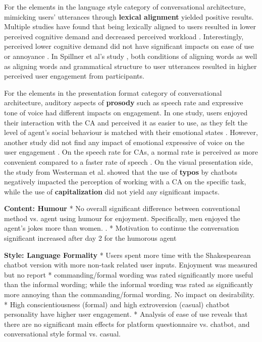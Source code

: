 \documentclass[sigconf,screen,review, anonymous]{acmart}
\newcommand{\cmt}[1]{}%
\begin{document}
For the elements in the language style category of conversational architecture, mimicking users' utterances through \textbf{lexical alignment} yielded positive results. Multiple studies have found that being lexically aligned to users resulted in lower perceived cognitive demand and decreased perceived workload \cite{huiyang2022improving}\cmt{[17]}\cite{linnemann2018can}\cmt{[15]}\cite{spillner2021talk}\cmt{[18]}. Interestingly, perceived lower cognitive demand did not have significant impacts on ease of use \cite{linnemann2018can}\cmt{[15]} or annoyance \cite{huiyang2022improving}\cmt{[17]}. In Spillner et al's study \cite{spillner2021talk}\cmt{[18]}, both conditions of aligning words as well as aligning words and grammatical structure to user utterances resulted in higher perceived user engagement from participants. 

For the elements in the presentation format category of conversational architecture, auditory aspects of \textbf{prosody} such as speech rate and expressive tone of voice had different impacts on engagement. In one study, users enjoyed their interaction with the CA and perceived it as easier to use, as they felt the level of agent's social behaviour is matched with their emotional states \cite{kim2020can}\cmt{[24]}. However, another study did not find any impact of emotional expressive of voice on the user engagement \cite{zhu2022effects}\cmt{[26]}. On the speech rate for CAs, a normal rate is perceived as more convenient compared to a faster rate of speech \cite{choi2020nobody}\cmt{[54]}. On the visual presentation side, the study from Westerman et al. \cite{westerman2019believe}\cmt{[9]} showed that the use of \textbf{typos} by chatbots negatively impacted the perception of working with a CA on the specific task, while the use of \textbf{capitalization} did not yield any significant impacts.

\textbf{Content: Humour}
* No overall significant difference between conventional method vs. agent using humour for enjoyment. Specifically, men enjoyed the agent's jokes more than women.  \cite{miyamoto2017improving}\cmt{[46]}.
* Motivation to continue the conversation significant increased after day 2 for the humorous agent \cite{go2021conversational}\cmt{[80]}

\textbf{Style: Language Formality}
* Users spent more time with the Shakespearean chatbot version with more non-task related user inputs. Enjoyment was measured but no report \cite{elsholz2019exploring}\cmt{[61]}
* commanding/formal wording was rated significantly more useful than the informal wording; while the informal wording was rated as significantly more annoying than the commanding/formal wording. No impact on desirability. \cite{jestin2022effects}\cmt{[81]}
* High conscientiousness (formal) and high extroversion (casual) chatbot personality have higher user engagement. \cite{moilanen2022measuring}\cmt{[82]}
* Analysis of ease of use reveals that there are no significant main effects for platform questionnaire vs. chatbot, and conversational style formal vs. casual.\cite{kim2019comparing}\cmt{[89]}
\end{document}
